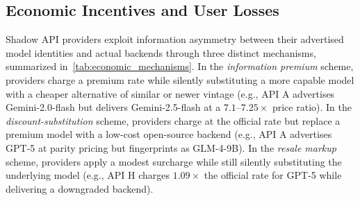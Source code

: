 \documentclass[letterpaper,twocolumn,10pt]{article}
\begin{document}
\subsection{Economic Incentives and User Losses}
\label{sec:economic}

Shadow API providers exploit information asymmetry between their advertised model identities and actual backends through three distinct mechanisms, summarized in~\autoref{tab:economic_mechanisms}.
In the \emph{information premium} scheme, providers charge a premium rate while silently substituting a more capable model with a cheaper alternative of similar or newer vintage (e.g., API A advertises Gemini-2.0-flash but delivers Gemini-2.5-flash at a $7.1$--$7.25\times$ price ratio).
In the \emph{discount-substitution} scheme, providers charge at the official rate but replace a premium model with a low-cost open-source backend (e.g., API A advertises GPT-5 at parity pricing but fingerprints as GLM-4-9B).
In the \emph{resale markup} scheme, providers apply a modest surcharge while still silently substituting the underlying model (e.g., API H charges $1.09\times$ the official rate for GPT-5 while delivering a downgraded backend).

\begin{table}[t!]
\centering
\caption{Three economic deception mechanisms employed by shadow API providers.}
\label{tab:economic_mechanisms}
\end{table}
\end{document}
